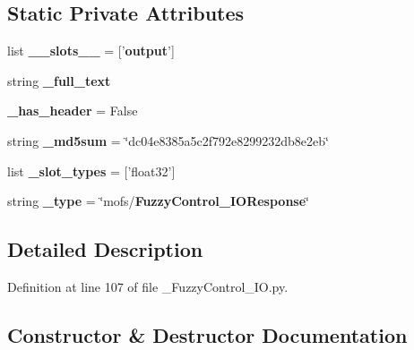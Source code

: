 \subsection*{Static Private Attributes}
\begin{DoxyCompactItemize}
\item 
list {\bf \-\_\-\-\_\-slots\-\_\-\-\_\-} = ['{\bf output}']
\item 
string {\bf \-\_\-full\-\_\-text}
\item 
{\bf \-\_\-has\-\_\-header} = False
\item 
string {\bf \-\_\-md5sum} = \char`\"{}dc04e8385a5c2f792e8299232db8e2eb\char`\"{}
\item 
list {\bf \-\_\-slot\-\_\-types} = ['float32']
\item 
string {\bf \-\_\-type} = \char`\"{}mofs/{\bf Fuzzy\-Control\-\_\-\-I\-O\-Response}\char`\"{}
\end{DoxyCompactItemize}


\subsection{Detailed Description}


Definition at line 107 of file \-\_\-\-Fuzzy\-Control\-\_\-\-I\-O.\-py.



\subsection{Constructor \& Destructor Documentation}
